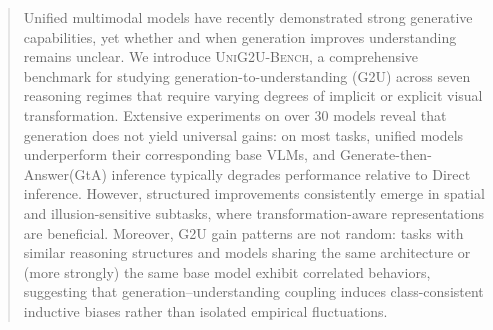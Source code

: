 \documentclass{article}
\theoremstyle{plain}
\theoremstyle{definition}
\theoremstyle{remark}
\begin{document}
\printAffiliationsAndNotice{}  %

\begin{abstract}
Unified multimodal models have recently demonstrated strong generative capabilities, yet whether and when generation improves understanding remains unclear. We introduce \textsc{UniG2U-Bench}, a comprehensive benchmark for studying generation-to-understanding (G2U) across seven reasoning regimes that require varying degrees of implicit or explicit visual transformation.
Extensive experiments on over 30 models reveal that generation does not yield universal gains: on most tasks, unified models underperform their corresponding base VLMs, and Generate-then-Answer(GtA) inference typically degrades performance relative to Direct inference. However, structured improvements consistently emerge in spatial and illusion-sensitive subtasks, where transformation-aware representations are beneficial. Moreover, G2U gain patterns are not random: tasks with similar reasoning structures and models sharing the same architecture or (more strongly) the same base model exhibit correlated behaviors, suggesting that generation–understanding coupling induces class-consistent inductive biases rather than isolated empirical fluctuations.
\end{abstract}





\end{document}
